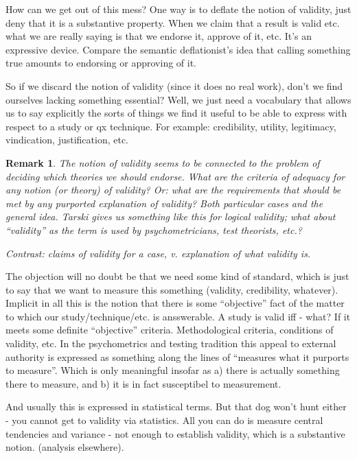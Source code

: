 \documentclass[11pt,twoside]{article}
\newtheorem{remark}{Remark}
\begin{document}
How can we get out of this mess?  One way is to deflate the notion of
validity, just deny that it is a substantive property.  When we claim
that a result is valid etc. what we are really saying is that we
endorse it, approve of it, etc.  It's an expressive device.  Compare
the semantic deflationist's idea that calling something true amounts
to endorsing or approving of it.

So if we discard the notion of validity (since it does no real work),
don't we find ourselves lacking something essential?  Well, we just
need a vocabulary that allows us to say explicitly the sorts of things
we find it useful to be able to express with respect to a study or qx
technique.  For example: credibility, utility, legitimacy,
vindication, justification, etc.

\begin{remark}
  The notion of validity seems to be connected to the problem of
  deciding which theories we should endorse.  What are the criteria of
  adequacy for any notion (or theory) of validity?  Or: what are the
  requirements that should be met by any purported explanation of
  validity?  Both particular cases and the general idea.  Tarski gives
  us something like this for logical validity; what about ``validity''
  as the term is used by psychometricians, test theorists, etc.?

Contrast: claims of validity for a case, v. explanation of what
validity is.


\end{remark}

The objection will no doubt be that we need some kind of standard,
which is just to say that we want to measure this something (validity,
credibility, whatever).  Implicit in all this is the notion that there
is some ``objective'' fact of the matter to which our
study/technique/etc. is ansswerable. A study is valid iff - what?  If
it meets some definite ``objective'' criteria.  Methodological
criteria, conditions of validity, etc.  In the psychometrics and
testing tradition this appeal to external authority is expressed as
something along the lines of ``measures what it purports to measure''.
Which is only meaningful insofar as a) there is actually something
there to measure, and b) it is in fact susceptibel to measurement.

And usually this is expressed in statistical terms.  But that dog
won't hunt either - you cannot get to validity via statistics.  All
you can do is measure central tendencies and variance - not enough to
establish validity, which is a substantive notion. (analysis
elsewhere).
\end{document}
